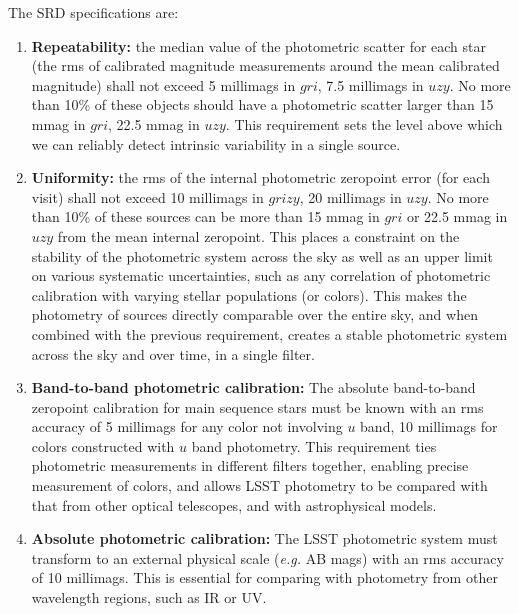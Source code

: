 \documentclass[12pt,preprint]{aastex}
\begin{document}
The SRD specifications are: 
\begin{enumerate}
\item{{\bf Repeatability:} the median value of the photometric scatter
for each star (the rms of calibrated magnitude measurements around the
mean calibrated magnitude) shall not exceed 5 millimags in $gri$, 7.5
millimags in $uzy$. No more than 10\% of these objects should have a photometric
scatter larger than 15 mmag in $gri$, 22.5 mmag in $uzy$.  This
requirement sets the level above which we can reliably detect intrinsic
variability in a single source. \label{repeatability_req}}

\item{{\bf Uniformity:} the rms of the internal photometric zeropoint
error (for each visit) shall not exceed 10 millimags in $grizy$, 20 millimags in $uzy$. 
No more than 10\% of these sources can be more than 15
mmag in $gri$ or 22.5 mmag in $uzy$ from the mean internal zeropoint.
This places a constraint on the stability of the photometric system
across the sky as well as an upper limit on various systematic
uncertainties, such as any correlation of photometric calibration with
varying stellar populations (or colors). This makes the photometry of
sources directly comparable over the entire sky, and when combined with
the previous requirement, creates a stable photometric system across
the sky and over time, in a single filter. \label{uniformity_req}}

\item{{\bf Band-to-band photometric calibration:} The absolute
band-to-band zeropoint calibration for main sequence stars must be
known with an rms accuracy of 5 millimags for any color not involving $u$
band, 10 millimags for colors constructed with $u$ band
photometry. This requirement ties photometric measurements in
different filters together, enabling precise measurement of colors, and
allows LSST photometry to be compared with that from other optical telescopes, and
with astrophysical models.
\label{color_req}}

\item{{\bf Absolute photometric calibration:} The LSST photometric
system must transform to an external physical scale ({\it e.g.} AB
mags) with an rms accuracy of 10 millimags.  This is essential for
comparing with photometry from other wavelength regions, such as IR
or UV.

\label{abs_req}}
\end{enumerate}
\end{document}
